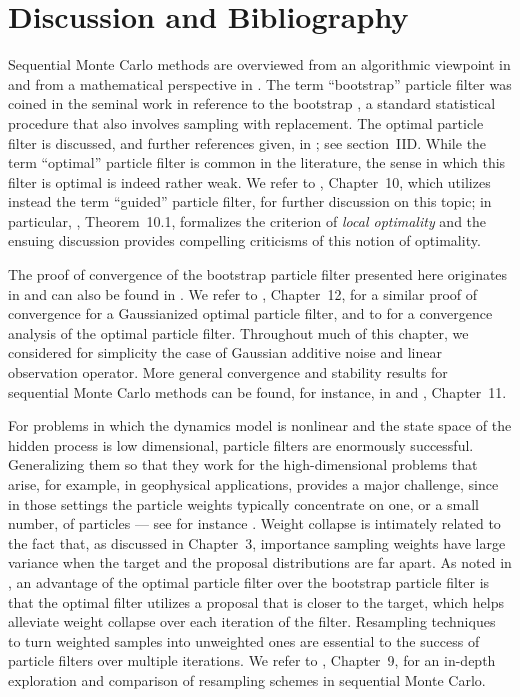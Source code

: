 
\section{Discussion and Bibliography}
\label{sec:9.4}

Sequential Monte Carlo methods are overviewed from an algorithmic viewpoint in
\cite{58,59} and from a mathematical perspective in \cite{54,49}. The term ``bootstrap''
particle filter was coined in the seminal work \cite{94} in reference to the bootstrap
\cite{70}, a standard statistical procedure that also involves sampling with replacement.
The optimal particle filter is discussed, and further references given, in \cite{59}; see
section~IID. While the term ``optimal'' particle filter is common in the literature, the
sense in which this filter is optimal is indeed rather weak. We refer to \cite{49}, Chapter~10,
which utilizes instead the term ``guided'' particle filter, for further discussion on
this topic; in particular, \cite{49}, Theorem~10.1, formalizes the criterion of
\emph{local optimality} and the ensuing discussion provides compelling criticisms of this
notion of optimality.

The proof of convergence of the bootstrap particle filter presented here originates in
\cite{190} and can also be found in \cite{208}. We refer to \cite{208}, Chapter~12, for a
similar proof of convergence for a Gaussianized optimal particle filter, and to \cite{118}
for a convergence analysis of the optimal particle filter. Throughout much of this
chapter, we considered for simplicity the case of Gaussian additive noise and linear
observation operator. More general convergence and stability results for sequential Monte
Carlo methods can be found, for instance, in \cite{54} and \cite{49}, Chapter~11.

For problems in which the dynamics model is nonlinear and the state space of the hidden
process is low dimensional, particle filters are enormously successful. Generalizing them
so that they work for the high-dimensional problems that arise, for example, in
geophysical applications, provides a major challenge, since in those settings the particle
weights typically concentrate on one, or a small number, of particles --- see for instance
\cite{24, 216, 215, 3}. Weight collapse is intimately related to the fact that, as
discussed in Chapter~3, importance sampling weights have large variance when the target
and the proposal distributions are far apart. As noted in \cite{217, 3}, an advantage of
the optimal particle filter over the bootstrap particle filter is that the optimal filter
utilizes a proposal that is closer to the target, which helps alleviate weight collapse
over each iteration of the filter. Resampling techniques to turn weighted samples into
unweighted ones are essential to the success of particle filters over multiple iterations.
We refer to \cite{49}, Chapter~9, for an in-depth exploration and comparison of resampling
schemes in sequential Monte Carlo.

